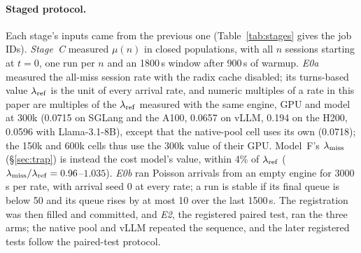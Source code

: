 \paragraph{Staged protocol.}\label{sec:stages}
Each stage's inputs came from the previous one (Table~\ref{tab:stages} gives the job IDs). \emph{Stage~C} measured $\mu(n)$ in closed populations, with all $n$ sessions starting at $t=0$, one run per $n$ and an 1800\,s window after 900\,s of warmup. \emph{E0a} measured the all-miss session rate with the radix cache disabled; its turns-based value $\lambda_{\mathrm{ref}}$ is the unit of every arrival rate, and numeric multiples of a rate in this paper are multiples of the $\lambda_{\mathrm{ref}}$ measured with the same engine, GPU and model at 300k (0.0715\sps{} on SGLang and the A100, 0.0657 on vLLM, 0.194 on the H200, 0.0596 with Llama-3.1-8B), except that the native-pool cell uses its own (0.0718); the 150k and 600k cells thus use the 300k value of their GPU. Model~F's $\lambda_{\mathrm{miss}}$ (\S\ref{sec:trap}) is instead the cost model's value, within 4\% of $\lambda_{\mathrm{ref}}$ ($\lambda_{\mathrm{miss}}/\lambda_{\mathrm{ref}}=0.96$--$1.035$). \emph{E0b} ran Poisson arrivals from an empty engine for 3000\,s per rate, with arrival seed 0 at every rate; a run is stable if its final queue is below 50 and its queue rises by at most 10 over the last 1500\,s. The registration was then filled and committed, and \emph{E2}, the registered paired test, ran the three arms; the native pool and vLLM repeated the sequence, and the later registered tests follow the paired-test protocol.

